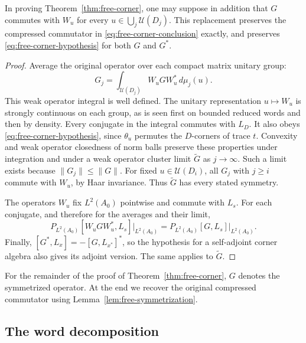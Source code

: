 \begin{lemma}[Symmetrization]\label{lem:free-symmetrization}
In proving Theorem~\ref{thm:free-corner}, one may suppose in addition
that $G$ commutes with $W_u$ for every
$u\in\bigcup_j\mathcal U(D_j)$.  This replacement preserves the
compressed commutator in \eqref{eq:free-corner-conclusion} exactly,
and preserves \eqref{eq:free-corner-hypothesis} for both $G$ and $G^*$.
\end{lemma}

\begin{proof}
Average the original operator over each compact matrix unitary group:
\[
 G_j=\int_{\mathcal U(D_j)}W_uGW_u^*\,d\mu_j(u).
\]
This weak operator integral is well defined.  The unitary
representation $u\mapsto W_u$ is strongly continuous on each group,
as is seen first on bounded reduced words and then by density.
Every conjugate in the integral commutes with $L_D$.  It also obeys
\eqref{eq:free-corner-hypothesis}, since $\theta_u$ permutes the
$D$-corners of trace $t$.  Convexity and weak operator closedness of
norm balls preserve these properties under integration and under a
weak operator cluster limit $\widetilde G$ as $j\to\infty$.
Such a limit exists because $\|G_j\|\leq\|G\|$.
For fixed $u\in\mathcal U(D_i)$, all $G_j$ with $j\geq i$ commute
with $W_u$, by Haar invariance.  Thus $\widetilde G$ has every stated
symmetry.

The operators $W_u$ fix $L^2(A_0)$ pointwise and commute with $L_s$.
For each conjugate, and therefore for the averages and their limit,
\[
 P_{L^2(A_0)}[W_uGW_u^*,L_s]\big|_{L^2(A_0)}
   =P_{L^2(A_0)}[G,L_s]\big|_{L^2(A_0)}.
\]
Finally,
$[G^*,L_x]=-[G,L_{x^*}]^*$, so the hypothesis for a self-adjoint
corner algebra also gives its adjoint version.  The same applies to
$\widetilde G$.
\end{proof}

For the remainder of the proof of Theorem~\ref{thm:free-corner},
$G$ denotes the symmetrized operator.  At the end we recover the
original compressed commutator using
Lemma~\ref{lem:free-symmetrization}.

\subsection{The word decomposition}

